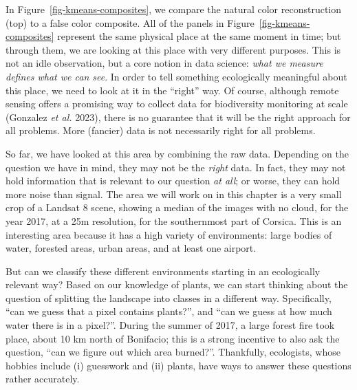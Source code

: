 \documentclass[
  letterpaper,
]{scrbook}
\begin{document}
In Figure~\ref{fig-kmeans-composites}, we compare the natural color
reconstruction (top) to a false color composite. All of the panels in
Figure~\ref{fig-kmeans-composites} represent the same physical place at
the same moment in time; but through them, we are looking at this place
with very different purposes. This is not an idle observation, but a
core notion in data science: \emph{what we measure defines what we can
see}. In order to tell something ecologically meaningful about this
place, we need to look at it in the ``right'' way. Of course, although
remote sensing offers a promising way to collect data for biodiversity
monitoring at scale (Gonzalez \emph{et al.} 2023), there is no guarantee
that it will be the right approach for all problems. More (fancier) data
is not necessarily right for all problems.


So far, we have looked at this area by combining the raw data. Depending
on the question we have in mind, they may not be the \emph{right} data.
In fact, they may not hold information that is relevant to our question
\emph{at all}; or worse, they can hold more noise than signal. The area
we will work on in this chapter is a very small crop of a Landsat 8
scene, showing a median of the images with no cloud, for the year 2017,
at a 25m resolution, for the southernmost part of Corsica. This is an
interesting area because it has a high variety of environments: large
bodies of water, forested areas, urban areas, and at least one airport.

But can we classify these different environments starting in an
ecologically relevant way? Based on our knowledge of plants, we can
start thinking about the question of splitting the landscape into
classes in a different way. Specifically, ``can we guess that a pixel
contains plants?'', and ``can we guess at how much water there is in a
pixel?''. During the summer of 2017, a large forest fire took place,
about 10 km north of Bonifacio; this is a strong incentive to also ask
the question, ``can we figure out which area burned?''. Thankfully,
ecologists, whose hobbies include (i) guesswork and (ii) plants, have
ways to answer these questions rather accurately.
\end{document}
